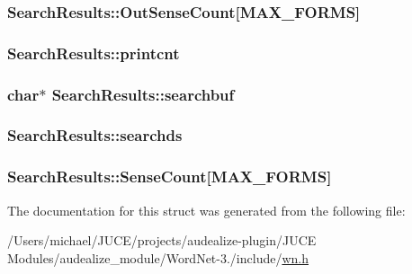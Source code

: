 \subsubsection[{\texorpdfstring{Out\+Sense\+Count}{OutSenseCount}}]{ Search\+Results\+::\+Out\+Sense\+Count\mbox{[}{\bf M\+A\+X\+\_\+\+F\+O\+R\+MS}\mbox{]}}\hypertarget{struct_search_results_a2bf1ec846a76e7de779ee452b3dc1d31}{}\label{struct_search_results_a2bf1ec846a76e7de779ee452b3dc1d31}
\subsubsection[{\texorpdfstring{printcnt}{printcnt}}]{ Search\+Results\+::printcnt}\hypertarget{struct_search_results_a58323667030ac776a25d4f58013c260e}{}\label{struct_search_results_a58323667030ac776a25d4f58013c260e}
\subsubsection[{\texorpdfstring{searchbuf}{searchbuf}}]{\setlength{\rightskip}{0pt plus 5cm}char$\ast$ Search\+Results\+::searchbuf}\hypertarget{struct_search_results_a63f8ae7e0f22fe1fba2b8d386466e19f}{}\label{struct_search_results_a63f8ae7e0f22fe1fba2b8d386466e19f}
\subsubsection[{\texorpdfstring{searchds}{searchds}}]{ Search\+Results\+::searchds}\hypertarget{struct_search_results_ad1b692c6bc782eec6e6921f3bc098bc3}{}\label{struct_search_results_ad1b692c6bc782eec6e6921f3bc098bc3}
\subsubsection[{\texorpdfstring{Sense\+Count}{SenseCount}}]{ Search\+Results\+::\+Sense\+Count\mbox{[}{\bf M\+A\+X\+\_\+\+F\+O\+R\+MS}\mbox{]}}\hypertarget{struct_search_results_aae62c7484f383b417e285aec5c970442}{}\label{struct_search_results_aae62c7484f383b417e285aec5c970442}


The documentation for this struct was generated from the following file\+:\begin{DoxyCompactItemize}
\item 
/\+Users/michael/\+J\+U\+C\+E/projects/audealize-\/plugin/\+J\+U\+C\+E Modules/audealize\+\_\+module/\+Word\+Net-\/3./include/\hyperlink{wn_8h}{wn.\+h}\end{DoxyCompactItemize}
